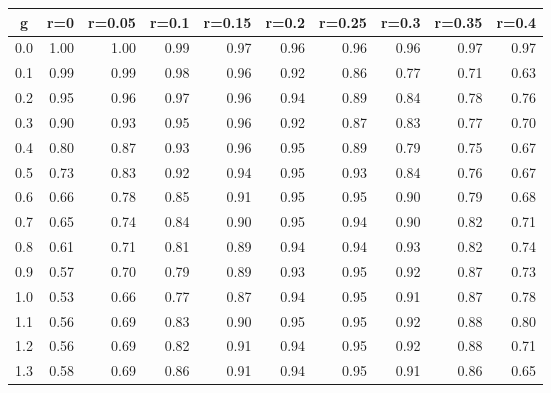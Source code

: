 %
\begin{table}[!tbp]
 \begin{center}
 \begin{tabular}{rrrrrrrrrr}\hline\hline
\multicolumn{1}{c}{g}&\multicolumn{1}{c}{r=0}&\multicolumn{1}{c}{r=0.05}&\multicolumn{1}{c}{r=0.1}&\multicolumn{1}{c}{r=0.15}&\multicolumn{1}{c}{r=0.2}&\multicolumn{1}{c}{r=0.25}&\multicolumn{1}{c}{r=0.3}&\multicolumn{1}{c}{r=0.35}&\multicolumn{1}{c}{r=0.4}\tabularnewline
\hline
0.0&1.00&1.00&0.99&0.97&0.96&0.96&0.96&0.97&0.97\tabularnewline
0.1&0.99&0.99&0.98&0.96&0.92&0.86&0.77&0.71&0.63\tabularnewline
0.2&0.95&0.96&0.97&0.96&0.94&0.89&0.84&0.78&0.76\tabularnewline
0.3&0.90&0.93&0.95&0.96&0.92&0.87&0.83&0.77&0.70\tabularnewline
0.4&0.80&0.87&0.93&0.96&0.95&0.89&0.79&0.75&0.67\tabularnewline
0.5&0.73&0.83&0.92&0.94&0.95&0.93&0.84&0.76&0.67\tabularnewline
0.6&0.66&0.78&0.85&0.91&0.95&0.95&0.90&0.79&0.68\tabularnewline
0.7&0.65&0.74&0.84&0.90&0.95&0.94&0.90&0.82&0.71\tabularnewline
0.8&0.61&0.71&0.81&0.89&0.94&0.94&0.93&0.82&0.74\tabularnewline
0.9&0.57&0.70&0.79&0.89&0.93&0.95&0.92&0.87&0.73\tabularnewline
1.0&0.53&0.66&0.77&0.87&0.94&0.95&0.91&0.87&0.78\tabularnewline
1.1&0.56&0.69&0.83&0.90&0.95&0.95&0.92&0.88&0.80\tabularnewline
1.2&0.56&0.69&0.82&0.91&0.94&0.95&0.92&0.88&0.71\tabularnewline
1.3&0.58&0.69&0.86&0.91&0.94&0.95&0.91&0.86&0.65\tabularnewline
\hline
\end{tabular}

\end{center}

\end{table}

